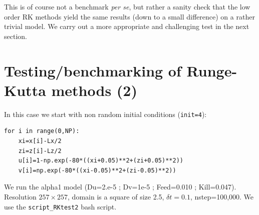 This is of course not a benchmark {\it per se}, but rather a sanity check that 
the low order RK methods yield the same results (down to a small difference) 
on a rather trivial model.
We carry out a more appropriate and challenging test in the next section.

\newpage
\section*{Testing/benchmarking of Runge-Kutta methods (2)}

In this case we start with non random initial conditions (\lstinline{init=4}):
\begin{lstlisting}
for i in range(0,NP):
    xi=x[i]-Lx/2
    zi=z[i]-Lz/2
    u[i]=1-np.exp(-80*((xi+0.05)**2+(zi+0.05)**2))
    v[i]=np.exp(-80*((xi-0.05)**2+(zi-0.05)**2))
\end{lstlisting}
We run the alpha1 model (Du=2.e-5 ; Dv=1e-5 ; Feed=0.010 ; Kill=0.047). 
Resolution $257\times 257$, domain is a square of size 2.5, 
$\delta t=0.1$, nstep=100,000.
We use the {\tt script\_RKtest2} bash script.

